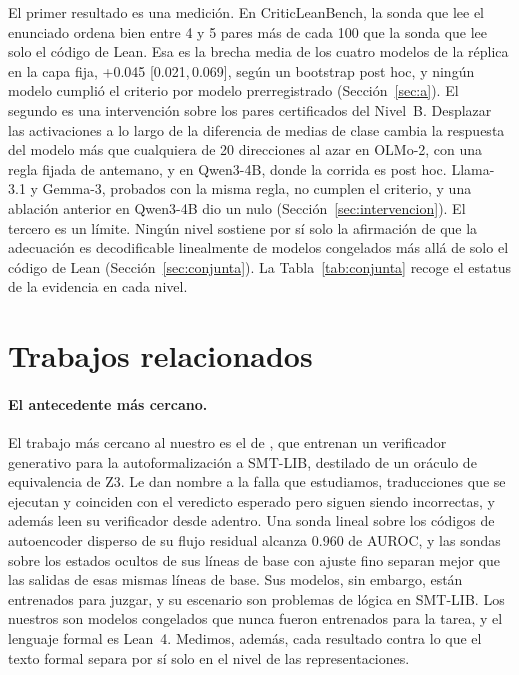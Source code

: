 \documentclass[10pt]{article}
\newcommand{\ic}[2]{[#1,\,#2]}
\begin{document}
El primer resultado es una medición. En CriticLeanBench, la sonda que lee el enunciado ordena bien entre 4 y 5 pares
más de cada 100 que la sonda que lee solo el código de Lean. Esa es la brecha media de los cuatro modelos de la
réplica en la capa fija, +0.045 \ic{0.021}{0.069}, según un bootstrap post hoc, y ningún modelo cumplió el criterio
por modelo prerregistrado (Sección~\ref{sec:a}). El segundo es una intervención sobre los pares certificados del
Nivel~B. Desplazar las activaciones a lo largo de la diferencia de medias de clase cambia la respuesta del modelo más
que cualquiera de 20 direcciones al azar en OLMo-2, con una regla fijada de antemano, y en Qwen3-4B, donde la corrida
es post hoc. Llama-3.1 y Gemma-3, probados con la misma regla, no cumplen el criterio, y una ablación anterior en
Qwen3-4B dio un nulo (Sección~\ref{sec:intervencion}). El tercero es un límite. Ningún nivel sostiene por sí solo la
afirmación de que la adecuación es decodificable linealmente de modelos congelados más allá de solo el código de Lean
(Sección~\ref{sec:conjunta}).
La Tabla~\ref{tab:conjunta} recoge el estatus de la evidencia en cada nivel.

\section{Trabajos relacionados}

\paragraph{El antecedente más cercano.}
El trabajo más cercano al nuestro es el de \citet{genv}, que entrenan un verificador generativo para la
autoformalización a SMT-LIB, destilado de un oráculo de equivalencia de Z3. Le dan nombre a la falla que
estudiamos, traducciones que se ejecutan y coinciden con el veredicto esperado pero siguen siendo incorrectas, y
además leen su verificador desde adentro. Una sonda lineal sobre los códigos de autoencoder disperso de su flujo
residual alcanza 0.960 de AUROC, y las sondas sobre los estados ocultos de sus líneas de base con ajuste fino
separan mejor que las salidas de esas mismas líneas de base. Sus modelos, sin embargo, están entrenados para
juzgar, y su escenario son problemas de lógica en SMT-LIB. Los nuestros son modelos congelados que nunca fueron
entrenados para la tarea, y el lenguaje formal es Lean~4. Medimos, además, cada resultado contra lo que el texto
formal separa por sí solo en el nivel de las representaciones.
\end{document}
